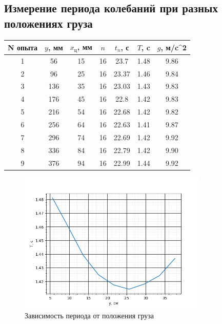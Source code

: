 \documentclass[a4paper, 12pt]{article}
\begin{document}
\subsection*{Измерение периода колебаний при разных положениях груза}


\begin{table}[h]
\begin{center}
\begin{tabular}{|c|c|c|c|c|c|c|}
\hline
N опыта & $y$, мм & $x_\text{ц}$, мм & $n$ & $t_n$, с & $T$, c & $g$, м/c^2 \\ \hline
1 & 56  & 15 & 16 & 23.7  & 1.48 & 9.86\\ \hline
2 & 96  & 25 & 16 & 23.37 & 1.46 & 9.84\\ \hline
3 & 136 & 35 & 16 & 23.03 & 1.43 & 9.83\\ \hline
4 & 176 & 45 & 16 & 22.8  & 1.42 & 9.83\\ \hline
5 & 216 & 54 & 16 & 22.68 & 1.42 & 9.82\\ \hline
6 & 256 & 64 & 16 & 22.63 & 1.41 & 9.87\\ \hline
7 & 296 & 74 & 16 & 22.69 & 1.42 & 9.92\\ \hline
8 & 336 & 84 & 16 & 22.79 & 1.42 & 9.90\\ \hline
9 & 376 & 94 & 16 & 22.99 & 1.44 & 9.92\\ \hline
\end{tabular}
\end{center}
\end{table}

\begin{figure}[h]
    \centering
    \includegraphics[width=0.8\textwidth]{1.png}
    \caption*{Зависимость периода от положения груза}
\end{figure}
\end{document}
